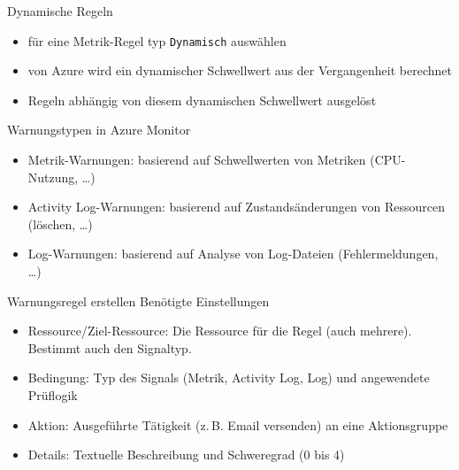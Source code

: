 
\begin{flashcard}[Definition]{Dynamische Regeln}
    \begin{itemize}
        \item für eine Metrik-Regel typ \texttt{Dynamisch} auswählen
        \item von Azure wird ein dynamischer Schwellwert aus der Vergangenheit berechnet
        \item Regeln abhängig von diesem dynamischen Schwellwert ausgelöst
    \end{itemize}
\end{flashcard}


\begin{flashcard}[Definition]{Warnungstypen in Azure Monitor}
    \begin{itemize}
        \item Metrik-Warnungen:\newline
            basierend auf Schwellwerten von Metriken (CPU-Nutzung, \ldots)
        \item Activity Log-Warnungen:\newline
            basierend auf Zustandsänderungen von Ressourcen (löschen, \ldots)
        \item Log-Warnungen:\newline
            basierend auf Analyse von Log-Dateien (Fehlermeldungen, \ldots)
    \end{itemize}
\end{flashcard}

\begin{flashcard}[Definition]{Warnungsregel erstellen}
    Benötigte Einstellungen
    \begin{itemize}
        \item Ressource/Ziel-Ressource:\newline
            Die Ressource für die Regel (auch mehrere). Bestimmt auch den Signaltyp.
        \item Bedingung:\newline
            Typ des Signals (Metrik, Activity Log, Log) und angewendete Prüflogik
        \item Aktion:\newline
            Ausgeführte Tätigkeit (z.\,B. Email versenden) an eine Aktionsgruppe
        \item Details:\newline
            Textuelle Beschreibung und Schweregrad (0 bis 4)
    \end{itemize}
    \vspace{1cm}
\end{flashcard}

